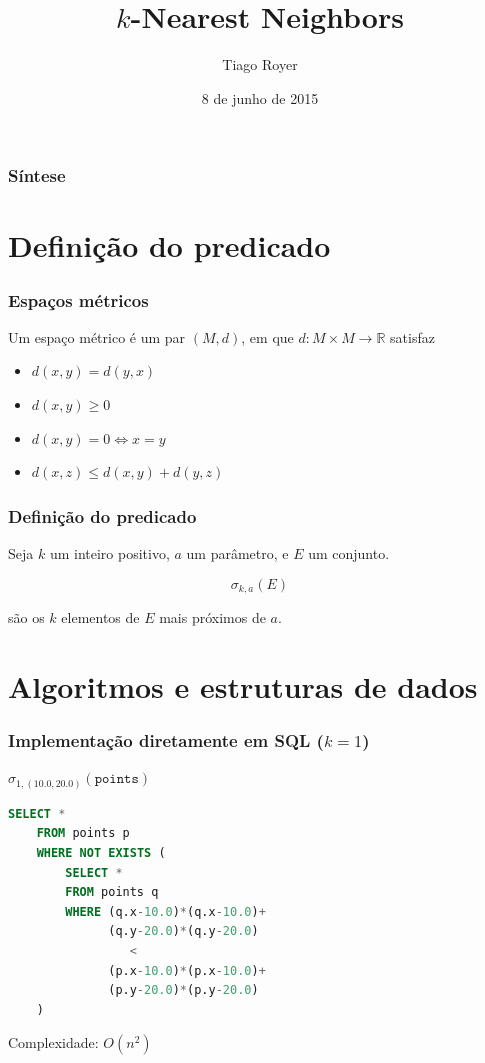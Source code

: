 \documentclass[utf8]{beamer}
\begin{document}
\author{Tiago Royer}
\title{$k$-Nearest Neighbors}
\date{8 de junho de 2015}
\begin{frame}
    \titlepage
\end{frame}

\begin{frame}
    \frametitle{Síntese}
    \tableofcontents
\end{frame}

\section{Definição do predicado}

\begin{frame}
    \frametitle{Espaços métricos}

    Um espaço métrico é um par $(M, d)$,
    em que $d : M \times M \rightarrow \mathbb R$ satisfaz

    \begin{itemize}
        \item $d(x, y) = d(y, x)$
        \item $d(x, y) \geq 0$
        \item $d(x, y) = 0 \Longleftrightarrow x = y$
        \item $d(x, z) \leq d(x, y) + d(y, z)$
    \end{itemize}
\end{frame}

\begin{frame}
    \frametitle{Definição do predicado}

    Seja $k$ um inteiro positivo,
    $a$ um parâmetro,
    e $E$ um conjunto.

    \begin{equation*}
        \sigma_{k, a}(E)
    \end{equation*}

    são os $k$ elementos de $E$ mais próximos de $a$.
    \nocite{two-kNN-predicates}
\end{frame}

\section{Algoritmos e estruturas de dados}

\begin{frame}[fragile]
    \frametitle{Implementação diretamente em SQL ($k = 1$)}

    $\sigma_{1, (10.0, 20.0)}(\texttt{points})$
    \begin{lstlisting}[language=SQL]
    SELECT *
    FROM points p
    WHERE NOT EXISTS (
        SELECT *
        FROM points q
        WHERE (q.x-10.0)*(q.x-10.0)+
              (q.y-20.0)*(q.y-20.0)
                 <
              (p.x-10.0)*(p.x-10.0)+
              (p.y-20.0)*(p.y-20.0)
    )
    \end{lstlisting}

    \pause
    Complexidade: $O(n^2)$
\end{frame}
\end{document}

